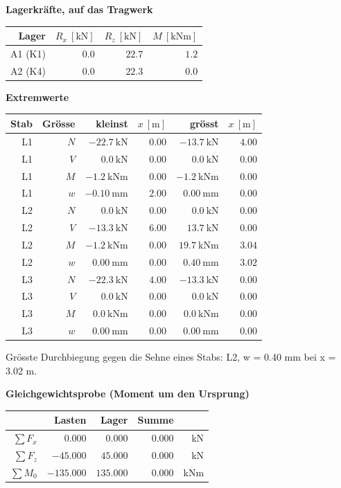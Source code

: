 \documentclass[11pt,a4paper]{article}
\begin{document}
\noindent\textbf{Lagerkräfte, auf das Tragwerk}
\begin{longtable}{rrrr}
\hline
Lager & $R_x\ [\mathrm{kN}]$ & $R_z\ [\mathrm{kN}]$ & $M\ [\mathrm{kNm}]$ \\
\hline
\endhead
A1 (K1) & $0.0$ & $22.7$ & $1.2$ \\
A2 (K4) & $0.0$ & $22.3$ & $0.0$ \\
\hline
\end{longtable}
\noindent\textbf{Extremwerte}
\begin{longtable}{rrrrrr}
\hline
Stab & Grösse & kleinst & $x\ [\mathrm{m}]$ & grösst & $x\ [\mathrm{m}]$ \\
\hline
\endhead
L1 & $N$ & $-22.7\ \mathrm{kN}$ & $0.00$ & $-13.7\ \mathrm{kN}$ & $4.00$ \\
L1 & $V$ & $0.0\ \mathrm{kN}$ & $0.00$ & $0.0\ \mathrm{kN}$ & $0.00$ \\
L1 & $M$ & $-1.2\ \mathrm{kNm}$ & $0.00$ & $-1.2\ \mathrm{kNm}$ & $0.00$ \\
L1 & $w$ & $-0.10\ \mathrm{mm}$ & $2.00$ & $0.00\ \mathrm{mm}$ & $0.00$ \\
L2 & $N$ & $0.0\ \mathrm{kN}$ & $0.00$ & $0.0\ \mathrm{kN}$ & $0.00$ \\
L2 & $V$ & $-13.3\ \mathrm{kN}$ & $6.00$ & $13.7\ \mathrm{kN}$ & $0.00$ \\
L2 & $M$ & $-1.2\ \mathrm{kNm}$ & $0.00$ & $19.7\ \mathrm{kNm}$ & $3.04$ \\
L2 & $w$ & $0.00\ \mathrm{mm}$ & $0.00$ & $0.40\ \mathrm{mm}$ & $3.02$ \\
L3 & $N$ & $-22.3\ \mathrm{kN}$ & $4.00$ & $-13.3\ \mathrm{kN}$ & $0.00$ \\
L3 & $V$ & $0.0\ \mathrm{kN}$ & $0.00$ & $0.0\ \mathrm{kN}$ & $0.00$ \\
L3 & $M$ & $0.0\ \mathrm{kNm}$ & $0.00$ & $0.0\ \mathrm{kNm}$ & $0.00$ \\
L3 & $w$ & $0.00\ \mathrm{mm}$ & $0.00$ & $0.00\ \mathrm{mm}$ & $0.00$ \\
\hline
\end{longtable}
Grösste Durchbiegung gegen die Sehne eines Stabs: L2, w = 0.40 mm bei x = 3.02 m.

\noindent\textbf{Gleichgewichtsprobe (Moment um den Ursprung)}
\begin{longtable}{rrrrr}
\hline
 & Lasten & Lager & Summe &  \\
\hline
\endhead
$\sum F_x$ & $0.000$ & $0.000$ & $0.000$ & kN \\
$\sum F_z$ & $-45.000$ & $45.000$ & $0.000$ & kN \\
$\sum M_0$ & $-135.000$ & $135.000$ & $0.000$ & kNm \\
\hline
\end{longtable}
\end{document}
